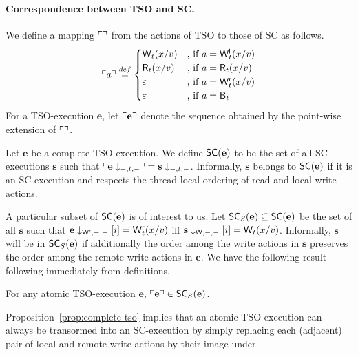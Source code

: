 \paragraph{Correspondence between TSO and SC.}
We define a mapping $\ulcorner \urcorner$ from the actions of TSO to those of SC as follows.
\[
\ulcorner a \urcorner \stackrel{def}{=} 
 \begin{cases}
  \mathsf{W}_{t}(x/v) & \text{, if } a=\mathsf{W}^{\mathsf{l}}_{t}(x/v)\\
  \mathsf{R}_{t}(x/v) & \text{, if } a=\mathsf{R}_{t}(x/v)\\
  \varepsilon & \text{, if } a=\mathsf{W}^{\mathsf{r}}_{t}(x/v)\\
  \varepsilon & \text{, if } a=\mathsf{B}_{t}
 \end{cases}
\]
For a TSO-execution $\mathbf{e}$, let $\ulcorner \mathbf{e} \urcorner$ denote the sequence obtained by the point-wise extension of $\ulcorner \urcorner$.

Let $\mathbf{e}$ be a complete TSO-execution.
We define $\mathsf{SC}(\mathbf{e})$ to be the set of all SC-executions $\mathbf{s}$ such that $\ulcorner \mathbf{e}\downarrow_{-,t,-} \urcorner=\mathbf{s}\downarrow_{-,t,-}$.
Informally, $\mathbf{s}$ belongs to $\mathsf{SC}(\mathbf{e})$ if it is an SC-execution and respects the thread local ordering of read and local write actions.

A particular subset of $\mathsf{SC}(\mathbf{e})$ is of interest to us.
Let $\mathsf{SC}_S(\mathbf{e})\subseteq \mathsf{SC}(\mathbf{e})$ be the set of all $\mathbf{s}$ such that $\mathbf{e}\downarrow_{\mathsf{W}^{\mathsf{r}},-,-} [i] = \mathsf{W}^{\mathsf{r}}_{t}(x/v)$ iff $\mathbf{s}\downarrow_{\mathsf{W},-,-}[i] = \mathsf{W}_{t}(x/v)$.
Informally, $\mathbf{s}$ will be in $\mathsf{SC}_S(\mathbf{e})$ if additionally the order among the write actions in $\mathbf{s}$ preserves the order among the remote write actions in $\mathbf{e}$.
We have the following result following immediately from definitions.

\begin{proposition}\label{prop:complete-tso}
For any atomic TSO-execution $\mathbf{e}$, $\ulcorner \mathbf{e} \urcorner \in \mathsf{SC}_S(\mathbf{e})$.
\end{proposition}
Proposition~\ref{prop:complete-tso} implies that an atomic TSO-execution can always be transormed into an SC-execution by simply replacing each (adjacent) pair of local and remote write actions by their image under $\ulcorner \urcorner$.

